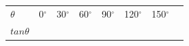 \begin{center}
\label{m39414*id89083}
\noindent
{}
\tablelasttail{}
\begin{xtabular*}{\mytablewidth}[t]{|p{10\mystarwidth}|p{10\mystarwidth}|p{10\mystarwidth}|p{10\mystarwidth}|p{10\mystarwidth}|p{10\mystarwidth}|p{10\mystarwidth}|p{10\mystarwidth}|}\hline
    $\theta $
    &
0${}^{\circ }$ &
30${}^{\circ }$ &
60${}^{\circ }$ &
90${}^{\circ }$ &
120${}^{\circ }$ &
150${}^{\circ }$ &
\tabularnewline{}
    $tan\theta $
    &
&
&

\end{xtabular*}
\end{center}
